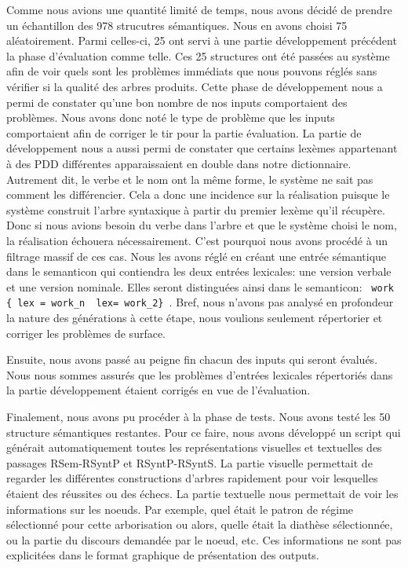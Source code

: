 Comme nous avions une quantité limité de temps, nous avons décidé de prendre un échantillon des 978 strucutres sémantiques. Nous en avons choisi 75 aléatoirement. Parmi celles-ci, 25 ont servi à une partie développement précédent la phase d'évaluation comme telle. Ces 25 structures ont été passées au système afin de voir quels sont les problèmes immédiats que nous pouvons réglés sans vérifier si la qualité des arbres produits. Cette phase de développement nous a permi de constater qu'une bon nombre de nos inputs comportaient des problèmes. Nous avons donc noté le type de problème que les inputs comportaient afin de corriger le tir pour la partie évaluation. La partie de développement nous a aussi permi de constater que certains lexèmes appartenant à des PDD différentes apparaissaient en double dans notre dictionnaire. Autrement dit, le verbe  et le nom  ont la même forme, le système ne sait pas comment les différencier. Cela a donc une incidence sur la réalisation puisque le système construit l'arbre syntaxique à partir du premier lexème qu'il récupère. Donc si nous avions besoin du verbe dans l'arbre et que le système choisi le nom, la réalisation échouera nécessairement. C'est pourquoi nous avons procédé à un filtrage massif de ces cas. Nous les avons réglé en créant une entrée sémantique dans le semanticon qui contiendra les deux entrées lexicales: une version verbale et une version nominale. Elles seront distinguées ainsi dans le semanticon: \lstinline! work { lex = work_n  lex= work_2} !. Bref, nous n'avons pas analysé en profondeur la nature des générations à cette étape, nous voulions seulement répertorier et corriger les problèmes de surface. 

Ensuite, nous avons passé au peigne fin chacun des inputs qui seront évalués. Nous nous sommes assurés que les problèmes d'entrées lexicales répertoriés dans la partie développement étaient corrigés en vue de l'évaluation.

Finalement, nous avons pu procéder à la phase de tests. Nous avons testé les 50 structure sémantiques restantes. Pour ce faire, nous avons développé un script qui générait automatiquement toutes les représentations visuelles et textuelles des passages RSem-RSyntP et RSyntP-RSyntS. La partie visuelle permettait de regarder les différentes constructions d'arbres rapidement pour voir lesquelles étaient des réussites ou des échecs. La partie textuelle nous permettait de voir les informations sur les noeuds. Par exemple, quel était le patron de régime sélectionné pour cette arborisation ou alors, quelle était la diathèse sélectionnée, ou la partie du discours demandée par le noeud, etc. Ces informations ne sont pas explicitées dans le format graphique de présentation des outputs.  

